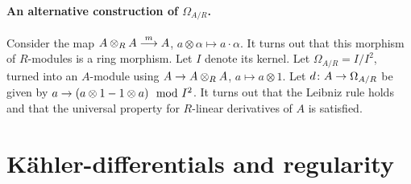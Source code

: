 \documentclass[a4paper,parskip=half,numbers=enddot, DIV=12]{scrreprt}
\begin{document}
\paragraph{An alternative construction of $\Omega_{A/R}$.} Consider the map $A\otimes_R A\morphism[m] A$, $a\otimes \alpha \mapsto a\cdot \alpha$. It turns out that this morphism of $R$-modules is a ring morphism. Let $I$ denote its kernel. Let $\Omega_{A/R} = I/I^2$, turned into an $A$-module using $A\morphism A\otimes_R A$, $a\mapsto a\otimes 1$. Let $d\colon A\morphism\Omega_{A/R}$ be given by $a\morphism (a\otimes 1-1\otimes a)\mod I^2$. It turns out that the Leibniz rule holds and that the universal property for $R$-linear derivatives of $A$ is satisfied.



\section{Kähler-differentials and regularity}
\end{document}
